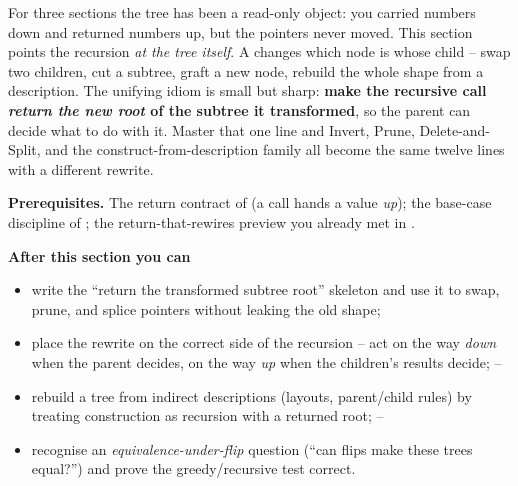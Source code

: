 \begin{topicintro}
For three sections the tree has been a read-only object: you carried numbers down
and returned numbers up, but the pointers never moved. This section points the
recursion \emph{at the tree itself}. A  changes
which node is whose child -- swap two children, cut a subtree, graft a new node,
rebuild the whole shape from a description. The unifying idiom is small but sharp:
\textbf{make the recursive call \emph{return the new root} of the subtree it
transformed}, so the parent can decide what to do with it. Master that one line
and Invert, Prune, Delete-and-Split, and the construct-from-description family
all become the same twelve lines with a different rewrite.

\textbf{Prerequisites.} The return contract of  (a call hands
a value \emph{up}); the base-case discipline of ; the
return-that-rewires preview you already met in .

\textbf{After this section you can}
\begin{itemize}[nosep]
  \item write the ``return the transformed subtree root'' skeleton and use it to
        swap, prune, and splice pointers without leaking the old shape;      \hfill{}
  \item place the rewrite on the correct side of the recursion -- act on the way
        \emph{down} when the parent decides, on the way \emph{up} when the
        children's results decide;                                            \hfill{}--
  \item rebuild a tree from indirect descriptions (layouts, parent/child rules)
        by treating construction as recursion with a returned root;           \hfill{}--
  \item recognise an \emph{equivalence-under-flip} question (``can flips make
        these trees equal?'') and prove the greedy/recursive test correct.     \hfill{}
\end{itemize}
\end{topicintro}

